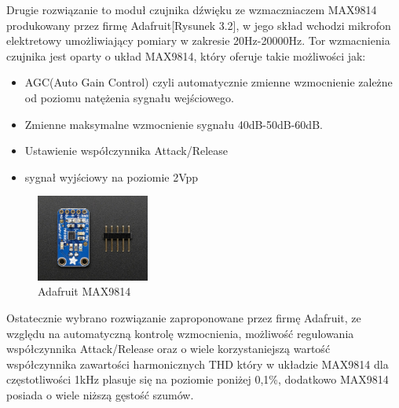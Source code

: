 \documentclass[eng,printmode]{mgr}
\begin{document}
 Drugie rozwiązanie to moduł czujnika dźwięku ze wzmaczniaczem MAX9814 produkowany przez firmę Adafruit[Rysunek 3.2], w jego skład wchodzi mikrofon elektretowy umożliwiający pomiary w zakresie 20Hz-20000Hz. Tor wzmacnienia czujnika jest oparty o układ MAX9814, który oferuje takie możliwości jak:
\begin{itemize}
\item AGC(Auto Gain Control) czyli automatycznie zmienne wzmocnienie zależne od poziomu natężenia sygnału wejściowego.
\item Zmienne maksymalne wzmocnienie sygnału 40dB-50dB-60dB. 
\item Ustawienie współczynnika Attack/Release 
\item sygnał wyjściowy na poziomie 2Vpp
\end{itemize}
\newpage
\begin{figure}

    \centering

  \includegraphics[width=0.33\textwidth, angle=0]{detektor2.jpg}

    \caption{Adafruit MAX9814}

    

\end{figure}

Ostatecznie wybrano rozwiązanie zaproponowane przez firmę Adafruit, ze względu na automatyczną kontrolę wzmocnienia, możliwość regulowania współczynnika Attack/Release oraz o wiele korzystaniejszą wartość współczynnika zawartości harmonicznych THD który w układzie MAX9814 dla częstotliwości 1kHz plasuje się na poziomie poniżej 0,1\%, dodatkowo MAX9814 posiada o wiele niższą gęstość szumów.
\end{document}
